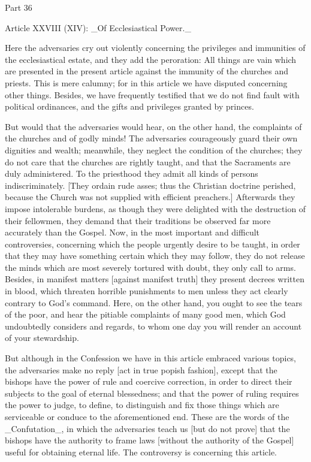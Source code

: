 Part 36


Article XXVIII (XIV): _Of Ecclesiastical Power._

Here the adversaries cry out violently concerning the privileges and
immunities of the ecclesiastical estate, and they add the peroration:
All things are vain which are presented in the present article
against the immunity of the churches and priests.  This is mere
calumny; for in this article we have disputed concerning other things.
Besides, we have frequently testified that we do not find fault
with political ordinances, and the gifts and privileges granted by
princes.

But would that the adversaries would hear, on the other hand, the
complaints of the churches and of godly minds!  The adversaries
courageously guard their own dignities and wealth; meanwhile, they
neglect the condition of the churches; they do not care that the
churches are rightly taught, and that the Sacraments are duly
administered.  To the priesthood they admit all kinds of persons
indiscriminately.  [They ordain rude asses; thus the Christian
doctrine perished, because the Church was not supplied with efficient
preachers.] Afterwards they impose intolerable burdens, as though
they were delighted with the destruction of their fellowmen, they
demand that their traditions be observed far more accurately than the
Gospel.  Now, in the most important and difficult controversies,
concerning which the people urgently desire to be taught, in order
that they may have something certain which they may follow, they do
not release the minds which are most severely tortured with doubt,
they only call to arms.  Besides, in manifest matters [against
manifest truth] they present decrees written in blood, which threaten
horrible punishments to men unless they act clearly contrary to God's
command.  Here, on the other hand, you ought to see the tears of the
poor, and hear the pitiable complaints of many good men, which God
undoubtedly considers and regards, to whom one day you will render an
account of your stewardship.

But although in the Confession we have in this article embraced
various topics, the adversaries make no reply [act in true popish
fashion], except that the bishops have the power of rule and coercive
correction, in order to direct their subjects to the goal of eternal
blessedness; and that the power of ruling requires the power to judge,
to define, to distinguish and fix those things which are serviceable
or conduce to the aforementioned end.  These are the words of the
_Confutation_, in which the adversaries teach us [but do not prove]
that the bishops have the authority to frame laws [without the
authority of the Gospel] useful for obtaining eternal life.  The
controversy is concerning this article.

